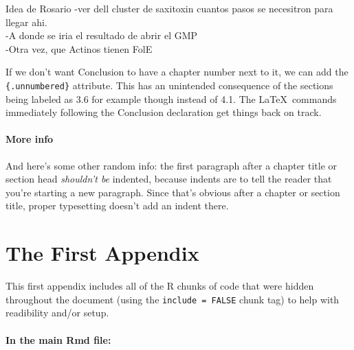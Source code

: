 \documentclass[12pt,twoside]{reedthesis}
\begin{document}
  \setcounter{chapter}{4} \setcounter{section}{0}
  
  Idea de Rosario -ver dell cluster de saxitoxin cuantos pasos se
  necesitron para llegar ahi.\\
  -A donde se iria el resultado de abrir el GMP\\
  -Otra vez, que Actinos tienen FolE
  
  If we don't want Conclusion to have a chapter number next to it, we can
  add the \texttt{\{.unnumbered\}} attribute. This has an unintended
  consequence of the sections being labeled as 3.6 for example though
  instead of 4.1. The \LaTeX~commands immediately following the Conclusion
  declaration get things back on track.
  
  \subsubsection{More info}\label{more-info}
  
  And here's some other random info: the first paragraph after a chapter
  title or section head \emph{shouldn't be} indented, because indents are
  to tell the reader that you're starting a new paragraph. Since that's
  obvious after a chapter or section title, proper typesetting doesn't add
  an indent there.
  
  \appendix
  
  \chapter{The First Appendix}\label{the-first-appendix}
  
  This first appendix includes all of the R chunks of code that were
  hidden throughout the document (using the \texttt{include\ =\ FALSE}
  chunk tag) to help with readibility and/or setup.
  
  \subsubsection{In the main Rmd file:}\label{in-the-main-rmd-file}
  
  \begin{Shaded}
  \begin{Highlighting}[]
    \NormalTok{(}\NormalTok{, } \NormalTok{)}
    \NormalTok{(}\NormalTok{)}
  \NormalTok{\}}
  \end{Highlighting}
  \end{Shaded}
  
\end{document}
